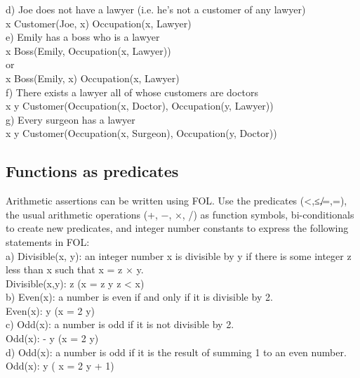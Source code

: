 \documentclass{article}
\begin{document}
d) Joe does not have a lawyer (i.e. he’s not a customer of any lawyer)\\
\forall x \: Customer(Joe, x) \Rightarrow \neg Occupation(x, Lawyer)\\

e) Emily has a boss who is a lawyer\\
\exists x \: Boss(Emily, Occupation(x, Lawyer))\\
or\\
\exists x \: Boss(Emily, x) \wedge Occupation(x, Lawyer)\\

f) There exists a lawyer all of whose customers are doctors\\
\exists x \forall y \: Customer(Occupation(x, Doctor), Occupation(y, Lawyer))\\

g) Every surgeon has a lawyer\\
\forall x \exists y \: Customer(Occupation(x, Surgeon), Occupation(y, Doctor))\\


\subsection{Functions as predicates}

Arithmetic assertions can be written using FOL. Use the predicates (<,≤,̸=,=), the usual arithmetic operations (+, −, ×, /) as function symbols, bi-conditionals to create new predicates, and integer number constants to express the following statements in FOL:\\

a) Divisible(x, y): an integer number x is divisible by y if there is some integer z less than x such that x = z × y.\\
Divisible(x,y): \exists z (x = z \times y \wedge z < x)\\

b) Even(x): a number is even if and only if it is divisible by 2.\\
Even(x): \exists y (x = 2 \times y)\\

c) Odd(x): a number is odd if it is not divisible by 2.\\
Odd(x): - \exists y (x = 2 \times y)\\

d) Odd(x): a number is odd if it is the result of summing 1 to an even number.\\
Odd(x): \exists y ( x = 2 \times y + 1)\\
\end{document}
